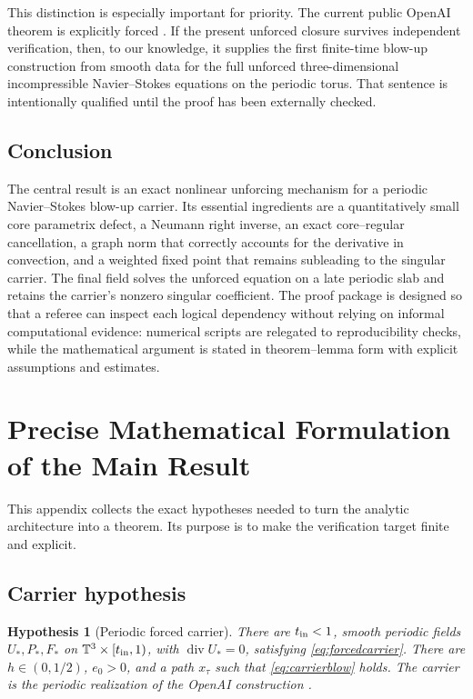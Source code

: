 \documentclass[11pt]{article}
\newtheorem{hypothesis}[theorem]{Hypothesis}
\numberwithin{equation}{section}
\newcommand{\T}{\mathbb T^3}
\newcommand{\diver}{\operatorname{div}}
\begin{document}
This distinction is especially important for priority.  The current public OpenAI theorem is explicitly forced \cite{OpenAI2026NS,OpenAIRepo2026}.  If the present unforced closure survives independent verification, then, to our knowledge, it supplies the first finite-time blow-up construction from smooth data for the full unforced three-dimensional incompressible Navier--Stokes equations on the periodic torus.  That sentence is intentionally qualified until the proof has been externally checked.

\subsection{Conclusion}
The central result is an exact nonlinear unforcing mechanism for a periodic Navier--Stokes blow-up carrier.  Its essential ingredients are a quantitatively small core parametrix defect, a Neumann right inverse, an exact core--regular cancellation, a graph norm that correctly accounts for the derivative in convection, and a weighted fixed point that remains subleading to the singular carrier.  The final field solves the unforced equation on a late periodic slab and retains the carrier's nonzero singular coefficient.  The proof package is designed so that a referee can inspect each logical dependency without relying on informal computational evidence: numerical scripts are relegated to reproducibility checks, while the mathematical argument is stated in theorem--lemma form with explicit assumptions and estimates.

\appendix

\section{Precise Mathematical Formulation of the Main Result}\label{app:precise}

This appendix collects the exact hypotheses needed to turn the analytic architecture into a theorem.  Its purpose is to make the verification target finite and explicit.

\subsection{Carrier hypothesis}
\begin{hypothesis}[Periodic forced carrier]\label{hyp:carrier}
There are \(t_{\rm in}<1\), smooth periodic fields \(U_*,P_*,F_*\) on \(\T\times[t_{\rm in},1)\), with \(\diver U_*=0\), satisfying \eqref{eq:forcedcarrier}.  There are \(h\in(0,1/2)\), \(e_0>0\), and a path \(x_\tau\) such that \eqref{eq:carrierblow} holds.  The carrier is the periodic realization of the OpenAI construction \cite{OpenAI2026NS,OpenAIRepo2026}.
\end{hypothesis}
\end{document}
